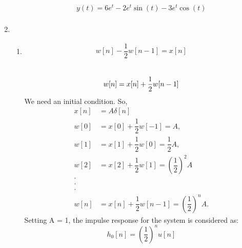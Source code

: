 \documentclass[10pt,a4paper, margin=1in]{article}
\begin{document}
\begin{enumerate}
\begin{enumerate}
    
    \begin{equation}
        \begin{split}
            y(t)=6e^t-2e^t\sin(t)-3e^t\cos(t)\\
        \end{split}
    \end{equation}
    \end{enumerate}


\item %
    \begin{enumerate}
    \item %
    \begin{equation}
        \begin{split}
            w[n]-\dfrac{1}{2}w[n-1]=x[n]\\
        \end{split}
    \end{equation}
    \\
    \begin{equation}
            w[n]=x[n]+\dfrac{1}{2}w[n-1]\\
    \end{equation}
    We need an initial condition. So,
    \begin{equation}
    \begin{split}
        x[n]&= A \delta[n]\\
        w[0]&= x[0]+\dfrac{1}{2}w[-1] = A,\\
        w[1]&= x[1]+\dfrac{1}{2}w[0] = \dfrac{1}{2}A,\\
        w[2]&= x[2]+\dfrac{1}{2}w[1] = \left(  \dfrac{1}{2} \right)^2 A\\
        \cdot\\
        \cdot\\
        \cdot\\
        w[n]&=x[n]+\dfrac{1}{2}w[n-1]=\left(\dfrac{1}{2}\right)^n A.
    \end{split}
    \end{equation}
    Setting A = 1, the impulse response for the system is considered as:
    \begin{equation}
        h_0[n] = \left( \dfrac{1}{2}\right)^nu[n]
    \end{equation}
    

\end{enumerate}
\end{enumerate}
\end{document}
